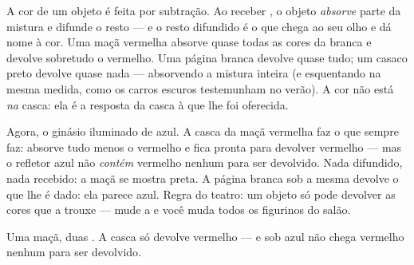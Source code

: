 \begin{proposition}\label{prop:g8:colors-spectra:objectcolor}
A cor de um objeto  é feita por subtração. Ao receber , o
objeto \emph{absorve} parte da mistura e difunde o resto --- e o
resto difundido é o que chega ao seu olho e dá nome à cor. Uma maçã
vermelha absorve quase todas as cores da  branca e devolve
sobretudo o vermelho. Uma página branca devolve quase tudo; um casaco
preto devolve quase nada --- absorvendo a mistura inteira (e
esquentando na mesma medida, como os carros escuros testemunham no
verão). A cor não está \emph{na} casca: ela é a resposta da casca à
 que lhe foi oferecida.
\end{proposition}

\begin{example}\label{ex:g8:colors-spectra:gym}
Agora, o ginásio iluminado de azul. A casca da maçã vermelha faz o
que sempre faz: absorve tudo menos o vermelho e fica pronta para
devolver vermelho --- mas o refletor azul não \emph{contém} vermelho
nenhum para ser devolvido. Nada difundido, nada recebido: a maçã se
mostra preta. A página branca sob a mesma  devolve o que lhe é
dado: ela parece azul. Regra do teatro: um objeto só pode devolver as
cores que a  trouxe --- mude a  e você muda todos os figurinos
do salão.
\end{example}

\begin{omfigure}

{\small Uma maçã, duas . A casca só devolve vermelho --- e sob
 azul não chega vermelho nenhum para ser devolvido.}
\end{omfigure}

